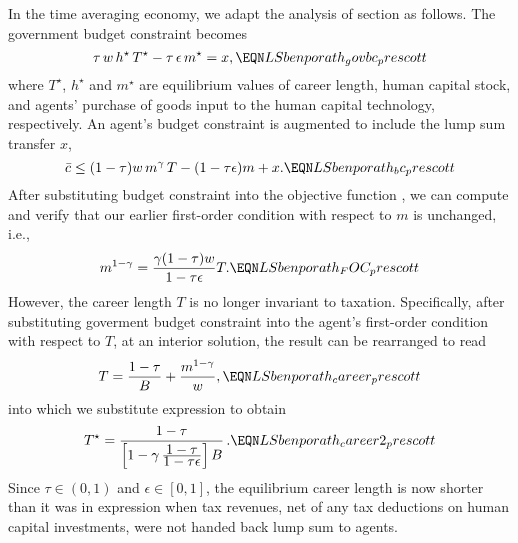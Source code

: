 In the time averaging economy, we adapt the analysis of section
 as follows. The government budget constraint becomes
$$
\tau\,w\,h^{\star}\, T^{\star} - \tau\, \epsilon \, m^{\star} = x,
                                        \EQN LSbenporath_govbc_prescott
$$
where $T^{\star}$, $h^{\star}$ and $m^{\star}$ are
equilibrium values of career length, human capital stock,
and agents' purchase of goods input to the human capital technology,
respectively. An agent's budget constraint is augmented to include
the lump sum transfer $x$,
$$
\bar c \leq (1-\tau) w \, m^{\gamma}\, T - (1-\tau \epsilon ) m + x.
                                         \EQN LSbenporath_bc_prescott
$$
After substituting budget constraint 
into the objective function  , we can
compute and verify that our earlier first-order condition
 with respect to $m$ is unchanged, i.e.,
$$
m^{1-\gamma} = {\gamma (1-\tau) w \over 1-\tau \epsilon } T.
                                         \EQN LSbenporath_FOC_prescott
$$
However, the career length $T$ is no
longer invariant to taxation. Specifically, after substituting
goverment budget constraint  into
the agent's first-order condition with respect to $T$, at an interior
solution, the result can be rearranged to read
$$
T = {1-\tau \over B} + {m^{1-\gamma } \over w},
                                        \EQN LSbenporath_career_prescott
$$
into which we substitute expression  to
obtain
$$
T^{\star} = { 1-\tau \over \left[ 1 - \gamma\,
    {\displaystyle 1-\tau \over \displaystyle 1 -\tau \epsilon } \right] B }\,.
                                        \EQN LSbenporath_career2_prescott
$$
Since $\tau \in (0,1)$ and $\epsilon \in [0,1]$, the equilibrium career
length is now shorter than it was in expression  when
tax revenues, net of any tax deductions on human capital investments,
were not handed back lump sum to agents.

